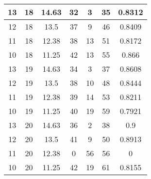 \documentclass[letterpaper, 12pt]{article}
\begin{document}
\begin{longtable}{|c|c|c|c|c|c|c|}
\hline
13 & 18 & 14.63 & 32 & 3 & 35 & 0.8312 \\
\hline
12 & 18 & 13.5 & 37 & 9 & 46 & 0.8409 \\
\hline
11 & 18 & 12.38 & 38 & 13 & 51 & 0.8172 \\
\hline
10 & 18 & 11.25 & 42 & 13 & 55 & 0.866 \\
\hline
13 & 19 & 14.63 & 34 & 3 & 37 & 0.8608 \\
\hline
12 & 19 & 13.5 & 38 & 10 & 48 & 0.8444 \\
\hline
11 & 19 & 12.38 & 39 & 14 & 53 & 0.8211 \\
\hline
10 & 19 & 11.25 & 40 & 19 & 59 & 0.7921 \\
\hline
13 & 20 & 14.63 & 36 & 2 & 38 & 0.9 \\
\hline
12 & 20 & 13.5 & 41 & 9 & 50 & 0.8913 \\
\hline
11 & 20 & 12.38 & 0 & 56 & 56 & 0 \\
\hline
10 & 20 & 11.25 & 42 & 19 & 61 & 0.8155 \\
\hline
\end{longtable}
\end{document}
